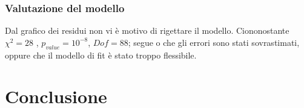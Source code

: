 \documentclass{article}
\begin{document}
\subsubsection{Valutazione del modello}

Dal grafico dei residui non vi è motivo di rigettare il modello.
Ciononostante  $\chi^2=28$ , $p_{value}=10^{-8}$, $Dof=88$; segue o che gli errori sono stati sovrastimati, oppure che il modello di fit è stato troppo flessibile.


\section{Conclusione}
\end{document}
